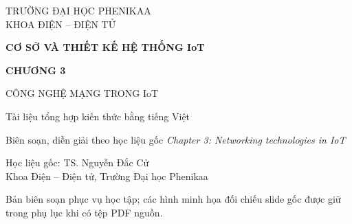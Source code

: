 \documentclass[12pt,a4paper,oneside]{report}
\begin{document}
\begin{titlepage}
\centering
\vspace*{30mm}
{\Large TRƯỜNG ĐẠI HỌC PHENIKAA\\ KHOA ĐIỆN -- ĐIỆN TỬ\par}
\vspace{18mm}
{\Huge\bfseries\color{navy}CƠ SỞ VÀ THIẾT KẾ HỆ THỐNG IoT\par}
\vspace{12mm}
{\Huge\bfseries\color{orangeiot}CHƯƠNG 3\par}
\vspace{5mm}
{\LARGE CÔNG NGHỆ MẠNG TRONG IoT\par}
\vspace{14mm}
{\large Tài liệu tổng hợp kiến thức bằng tiếng Việt\par}
{\large Biên soạn, diễn giải theo học liệu gốc \textit{Chapter 3: Networking technologies in IoT}\par}
\vfill
{\large Học liệu gốc: TS. Nguyễn Đắc Cử\\ Khoa Điện -- Điện tử, Trường Đại học Phenikaa\par}
\vspace{8mm}
{\small Bản biên soạn phục vụ học tập; các hình minh họa đối chiếu slide gốc được giữ trong phụ lục khi có tệp PDF nguồn.}\par
\end{titlepage}
\tableofcontents\clearpage
\setcounter{chapter}{2}

\clearpage
{}
\end{document}

